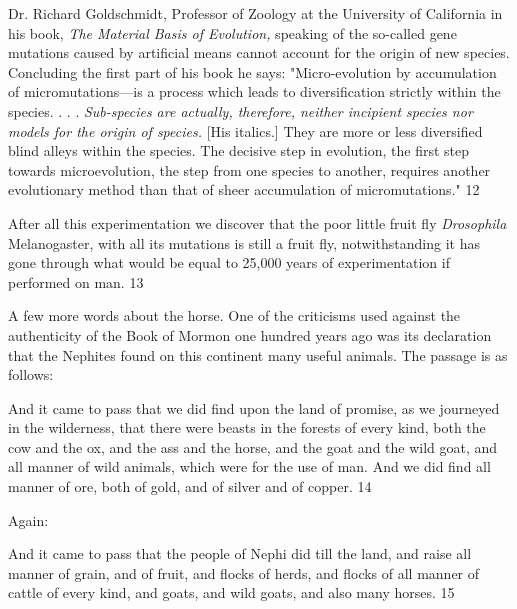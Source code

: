 Dr. Richard Goldschmidt, Professor of Zoology at the University of California in his book,
\textit{The Material Basis of Evolution,} speaking of the so-called gene mutations caused by artificial
means cannot account for the origin of new species. Concluding the first part of his book he
says: "Micro-evolution by accumulation of micromutations—is a process which leads to
diversification strictly within the species. . . . \textit{Sub-species are actually, therefore, neither
incipient species nor models for the origin of species.} [His italics.] They are more or less
diversified blind alleys within the species. The decisive step in evolution, the first step
towards microevolution, the step from one species to another, requires another evolutionary
method than that of sheer accumulation of micromutations." 12

After all this experimentation we discover that the poor little fruit fly \textit{Drosophila}
Melanogaster, with all its mutations is still a fruit fly, notwithstanding it has gone through
what would be equal to 25,000 years of experimentation if performed on man. 13

A few more words about the horse. One of the criticisms used against the authenticity of the
Book of Mormon one hundred years ago was its declaration that the Nephites found on this
continent many useful animals. The passage is as follows:

And it came to pass that we did find upon the land of promise, as we journeyed in the
wilderness, that there were beasts in the forests of every kind, both the cow and the ox, and
the ass and the horse, and the goat and the wild goat, and all manner of wild animals, which
were for the use of man. And we did find all manner of ore, both of gold, and of silver and of
copper. 14

Again:

And it came to pass that the people of Nephi did till the land, and raise all manner of grain,
and of fruit, and flocks of herds, and flocks of all manner of cattle of every kind, and goats,
and wild goats, and also many horses. 15

